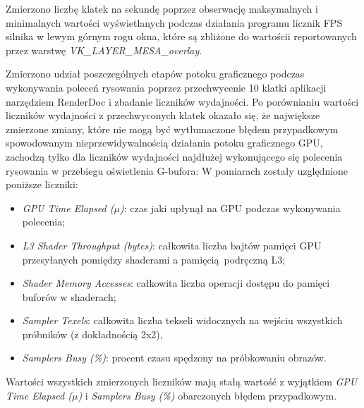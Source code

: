 Zmierzono liczbę klatek na sekundę poprzez obserwację maksymalnych i minimalnych wartości wyświetlanych podczas działania programu licznik FPS silnika w lewym górnym rogu okna, które są zbliżone do wartościi reportowanych przez warstwę \textit{VK\_LAYER\_MESA\_overlay}.

Zmierzono udział poszczególnych etapów potoku graficznego podczas wykonywania poleceń rysowania poprzez przechwycenie 10 klatki aplikacji narzędziem RenderDoc i zbadanie liczników wydajności.
Po porównianiu wartości liczników wydajności z przechwyconych klatek okazało się, że największe zmierzone zmiany, które nie mogą być wytłumaczone błędem przypadkowym spowodowanym nieprzewidywalnością działania potoku graficznego GPU, zachodzą tylko dla liczników wydajności najdłużej wykonującego się polecenia rysowania w przebiegu oświetlenia G-bufora:
W pomiarach zostały uzględnione poniższe liczniki:
\begin{itemize}
	\item \textit{GPU Time Elapsed ($\mu$)}: czas jaki upłynął na GPU podczas wykonywania polecenia;
	\item \textit{L3 Shader Throughput (bytes)}: całkowita liczba bajtów pamięci GPU przesyłanych pomiędzy shaderami a pamięcią podręczną L3;
	\item \textit{Shader Memory Accesses}: całkowita liczba operacji dostępu do pamięci buforów w shaderach;
	\item \textit{Sampler Texels}: całkowita liczba tekseli widocznych na wejściu wszystkich próbników (z dokładnością 2x2),
	\item \textit{Samplers Busy (\%)}: procent czasu spędzony na próbkowaniu obrazów.
\end{itemize}
Wartości wszystkich zmierzonych liczników mają stałą wartość z wyjątkiem \textit{GPU Time Elapsed ($\mu$)} i \textit{Samplers Busy (\%)} obarczonych błędem przypadkowym.

